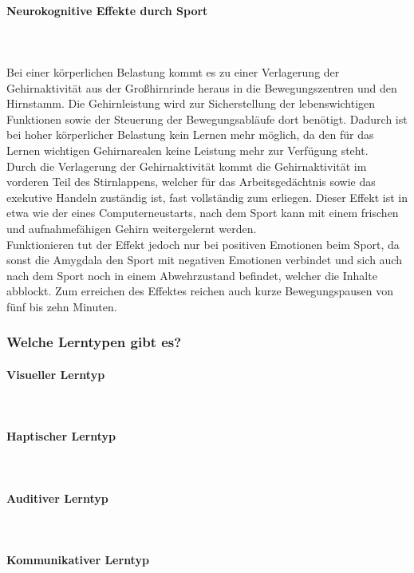 \paragraph{Neurokognitive Effekte durch Sport}~\\
\\
Bei einer körperlichen Belastung kommt es zu einer Verlagerung der Gehirnaktivität aus der Großhirnrinde heraus in die Bewegungszentren und den Hirnstamm. Die Gehirnleistung wird zur Sicherstellung der lebenswichtigen Funktionen sowie der Steuerung der Bewegungsabläufe dort benötigt. Dadurch ist bei hoher körperlicher Belastung kein Lernen mehr möglich, da den für das Lernen wichtigen Gehirnarealen keine Leistung mehr zur Verfügung steht.\\
Durch die Verlagerung der Gehirnaktivität kommt die Gehirnaktivität im vorderen Teil des Stirnlappens, welcher für das Arbeitsgedächtnis sowie das exekutive Handeln zuständig ist, fast vollständig zum erliegen. Dieser Effekt ist in etwa wie der eines Computerneustarts, nach dem Sport kann mit einem frischen und aufnahmefähigen Gehirn weitergelernt werden.\\
Funktionieren tut der Effekt jedoch nur bei positiven Emotionen beim Sport, da sonst die Amygdala den Sport mit negativen Emotionen verbindet und sich auch nach dem Sport noch in einem Abwehrzustand befindet, welcher die Inhalte abblockt. Zum erreichen des Effektes reichen auch kurze Bewegungspausen von fünf bis zehn Minuten.\\

\subsubsection{Welche Lerntypen gibt es?}

\paragraph{Visueller Lerntyp}~\\
\paragraph{Haptischer Lerntyp}~\\
\paragraph{Auditiver Lerntyp}~\\
\paragraph{Kommunikativer Lerntyp}~\\

